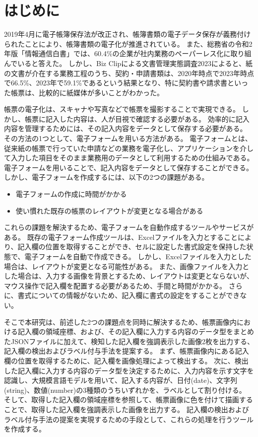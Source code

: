 \chapter{はじめに}\label{cha:Introduction}
2019年4月に電子帳簿保存法が改正され、帳簿書類の電子データ保存が義務付けられたことにより、帳簿書類の電子化が推進されている\cite{電子帳簿保存法}。
また、総務省の令和2年版「情報通信白書」では、60.4\%の企業が社内業務のペーパーレス化に取り組んでいると答えた\cite{デジタルデータの経済的価値の計測と活用の現状に関する調査研究}。
しかし、Biz Clipによる文書管理実態調査2023によると、紙の文書が介在する業務工程のうち、契約・申請書類は、2020年時点で2023年時点で66.5\%、2023年で59.1\%であるという結果となり、特に契約書や請求書といった帳票は、比較的に紙媒体が多いことがわかった\cite{文書管理実態調査2023}。

帳票の電子化は、スキャナや写真などで帳票を撮影することで実現できる。
しかし、帳票に記入した内容は、人が目視で確認する必要がある。
効率的に記入内容を管理するためには、その記入内容をデータとして保存する必要がある。
その方法の1つとして、電子フォームを用いる方法がある。
電子フォームとは、従来紙の帳票で行っていた申請などの業務を電子化し、アプリケーションを介して入力した項目をそのまま業務用のデータとして利用するための仕組みである\cite{電子フォーム}。
電子フォームを用いることで、記入内容をデータとして保存することができる。
しかし、電子フォームを作成するには、以下の2つの課題がある。

\begin{itemize}
  \item 電子フォームの作成に時間がかかる
  \item 使い慣れた既存の帳票のレイアウトが変更となる場合がある
\end{itemize}

これらの課題を解決するため、電子フォームを自動作成するツールやサービスがある。
既存の電子フォーム作成ツール\cite{i-Reporter}\cite{Create!Form}は、Excelファイルを入力とすることにより、記入欄の位置を取得することができ、セルに設定した書式設定を保持した状態で、電子フォームを自動で作成できる。
しかし、Excelファイルを入力とした場合は、レイアウトが変更となる可能性がある。
また、画像ファイルを入力とした場合は、入力する画像を背景とするため、レイアウトは変更とならないが、マウス操作で記入欄を配置する必要があるため、手間と時間がかかる。
さらに、書式についての情報がないため、記入欄に書式の設定をすることができない。

そこで本研究は、前述した2つの課題点を同時に解決するため、帳票画像内における記入欄の領域座標、および、その記入欄に入力する内容のデータ型をまとめたJSONファイルに加えて、検知した記入欄を強調表示した画像2枚を出力する、記入欄の検出およびラベル付与手法を提案する。
まず、帳票画像内にある記入欄の位置を取得するために、記入欄を画像処理によって検出する。
次に、検出した記入欄に入力する内容のデータ型を決定するために、入力内容を示す文字を認識し、大規模言語モデルを用いて、記入する内容が、日付(date)、文字列(string)、数値(number)の3種類のうちいずれかを、ラベルとして割り付ける。
そして、取得した記入欄の領域座標を参照して、帳票画像に色を付けて描画することで、取得した記入欄を強調表示した画像を出力する。
記入欄の検出およびラベル付与手法の提案を実現するための手段として、これらの処理を行うツールを作成する。

